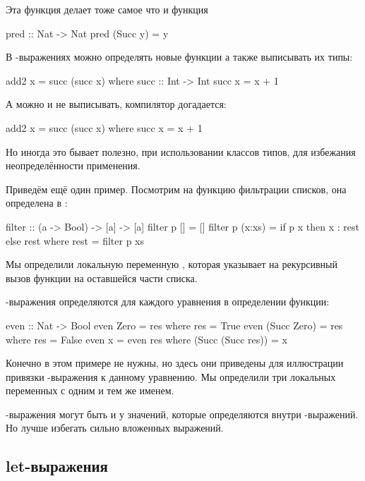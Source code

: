Эта функция делает тоже самое что и функция


\begin{code}
pred :: Nat -> Nat
pred (Succ y) = y
\end{code}

В -выражениях можно определять новые функции а также
выписывать их типы:


\begin{code}
add2 x = succ (succ x)
    where succ :: Int -> Int
          succ x = x + 1
\end{code}

А можно и не выписывать, компилятор догадается:


\begin{code}
add2 x = succ (succ x)
    where succ x = x + 1
\end{code}

Но иногда это бывает полезно, при использовании классов типов, для
избежания неопределённости применения.

Приведём ещё один пример. Посмотрим на функцию фильтрации списков, она
определена в :


\begin{code}
filter :: (a -> Bool) -> [a] -> [a]
filter  p  []     = []
filter  p  (x:xs) = if p x then x : rest else rest
    where rest = filter p xs
\end{code}

Мы определили локальную переменную , которая указывает на
рекурсивный вызов функции на оставшейся части списка.

-выражения определяются для каждого уравнения в определении
функции:


\begin{code}
even :: Nat -> Bool
even Zero        = res
    where res = True
even (Succ Zero) = res
    where res = False
even x = even res
    where (Succ (Succ res)) = x
\end{code}

Конечно в этом примере  не нужны, но здесь они приведены для
иллюстрации привязки -выражения к данному уравнению. Мы
определили три локальных переменных с одним и тем же именем.

-выражения могут быть и у значений, которые определяются
внутри -выражений. Но лучше избегать сильно вложенных
выражений.

\subsection{let-выражения}

